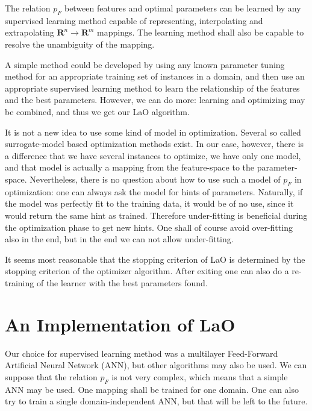 \documentclass{article}
\begin{document}
The relation \begin{math} p_F \end{math} between features and optimal parameters can be learned by any supervised learning method capable of representing, interpolating and extrapolating  \begin{math}\mathbf{R}^n\to \mathbf{R}^m \end{math} mappings. The learning method shall also be capable to resolve the unambiguity of the mapping.

A simple method could be developed by using any known parameter tuning method for an appropriate training set of instances in a domain, and then use an appropriate supervised learning method to learn the relationship of the features and the best parameters. However, we can do more: learning and optimizing may be combined, and thus we get our LaO algorithm.

It is not a new idea to use some kind of model in optimization. Several so called surrogate-model based optimization methods exist. In our case, however, there is a difference that we have several instances to optimize, we have only one model, and that model is actually a mapping from the feature-space to the parameter-space. Nevertheless, there is no question about how to use such a model of \begin{math}p_F\end{math} in optimization: one can always ask the model for hints of parameters. Naturally, if the model was perfectly fit to the training data, it would be of no use, since it would return the same hint as trained. Therefore under-fitting is beneficial during the optimization phase to get new hints. One shall of course avoid over-fitting also in the end, but in the end we can not allow under-fitting.

It seems most reasonable that the stopping criterion of LaO is determined by the stopping criterion of the optimizer algorithm. After exiting one can also do a re-training of the learner with the best parameters found.

\section{An Implementation of LaO}
\label{section:implementation}

Our choice for supervised learning method was a multilayer Feed-Forward Artificial Neural Network (ANN), but other algorithms may also be used. We can suppose that the relation \begin{math}p_F\end{math} is not very complex, which means that a simple ANN may be used. One mapping shall be trained for one domain. One can also try to train a single domain-independent ANN, but that will be left to the future.
\end{document}
